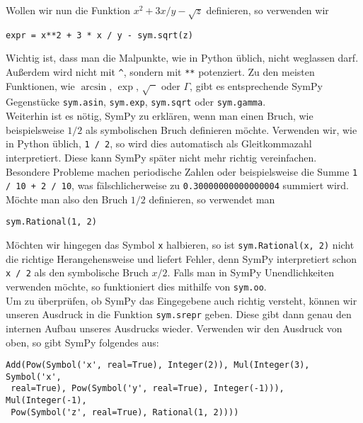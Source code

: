 \newpage

Wollen wir nun die Funktion $x^2 + 3 x / y - \sqrt{z}$ definieren, so verwenden wir

\begin{lstlisting}
expr = x**2 + 3 * x / y - sym.sqrt(z)
\end{lstlisting}

Wichtig ist, dass man die Malpunkte, wie in Python üblich, nicht weglassen darf. Außerdem wird nicht mit \lstinline|^|, sondern mit \lstinline|**| potenziert. Zu den meisten Funktionen, wie $\arcsin$, $\exp$, $\sqrt{\phantom{x}}$ oder $\Gamma$, gibt es entsprechende SymPy Gegenstücke \lstinline|sym.asin|, \lstinline|sym.exp|, \lstinline|sym.sqrt| oder \lstinline|sym.gamma|.\\

Weiterhin ist es nötig, SymPy zu erklären, wenn man einen Bruch, wie beispielsweise $1 / 2$ als symbolischen Bruch definieren möchte. Verwenden wir, wie in Python üblich, \lstinline|1 / 2|, so wird dies automatisch als Gleitkommazahl  interpretiert. Diese kann SymPy später nicht mehr richtig vereinfachen. Besondere Probleme machen periodische Zahlen oder beispielsweise die Summe \lstinline|1 / 10 + 2 / 10|, was fälschlicherweise zu \lstinline|0.30000000000000004| summiert wird. Möchte man also den Bruch $1 / 2$ definieren, so verwendet man

\begin{lstlisting}
sym.Rational(1, 2)
\end{lstlisting}

Möchten wir hingegen das Symbol \lstinline|x| halbieren, so ist \lstinline|sym.Rational(x, 2)| nicht die richtige Herangehensweise und liefert Fehler, denn SymPy interpretiert schon \lstinline|x / 2| als den symbolische Bruch $x / 2$. Falls man in SymPy Unendlichkeiten verwenden möchte, so funktioniert dies mithilfe von \lstinline|sym.oo|.\\

Um zu überprüfen, ob SymPy das Eingegebene auch richtig versteht, können wir unseren Ausdruck in die Funktion \lstinline|sym.srepr| geben. Diese gibt dann genau den internen Aufbau unseres Ausdrucks wieder. Verwenden wir den Ausdruck von oben, so gibt SymPy folgendes aus:

\begin{lstlisting}
Add(Pow(Symbol('x', real=True), Integer(2)), Mul(Integer(3), Symbol('x',
 real=True), Pow(Symbol('y', real=True), Integer(-1))), Mul(Integer(-1),
 Pow(Symbol('z', real=True), Rational(1, 2))))
\end{lstlisting}

